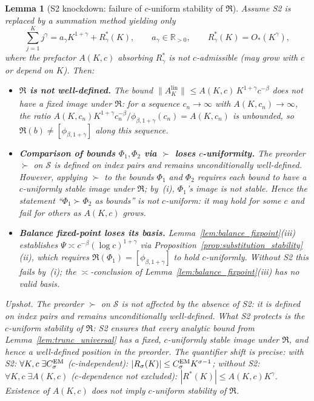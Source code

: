 \documentclass[12pt,a4paper]{amsart}
\newtheorem{lemma}[theorem]{Lemma}
\theoremstyle{definition}
\newcommand{\R}{\mathbb{R}}
\newcommand{\normh}[2]{\|#1\|_{#2}}
\newcommand{\AKlin}{A_K^{\mathrm{lin}}}
\begin{document}
\begin{lemma}[S2 knockdown: failure of $c$-uniform stability of $\mathfrak{R}$]
\label{lem:S2_knockdown}
Assume S2 is replaced by a summation method yielding only
\begin{equation}\label{eq:S2weak}
  \sum_{j=1}^K j^\gamma
  = a_\gamma K^{1+\gamma} + R_\gamma^*(K),
  \qquad a_\gamma\in\R_{>0},
  \qquad R_\gamma^*(K) = O_*(K^\gamma),
\end{equation}
where the prefactor $A(K,c)$ absorbing $R_\gamma^*$ is not
$c$-admissible (may grow with $c$ or depend on $K$).
Then:
\begin{itemize}[nosep]
  \item[\textup{(i)}] \textbf{$\mathfrak{R}$ is not well-defined.}
    The bound $\normh{\AKlin}{}\leq A(K,c)\,K^{1+\gamma}c^{-\beta}$
    does not have a fixed image under $\mathfrak{R}$:
    for a sequence $c_n\to\infty$ with $A(K,c_n)\to\infty$,
    the ratio $A(K,c_n)K^{1+\gamma}c_n^{-\beta}/\phi_{\beta,1+\gamma}(c_n)
    = A(K,c_n)$ is unbounded,
    so $\mathfrak{R}(b)\neq [\phi_{\beta,1+\gamma}]$ along this sequence.

  \item[\textup{(ii)}] \textbf{Comparison of bounds $\Phi_1,\Phi_2$
    via $\succ$ loses $c$-uniformity.}
    The preorder $\succ$ on $\mathcal{S}$ is defined on index pairs
    and remains unconditionally well-defined.
    However, applying $\succ$ to the \emph{bounds} $\Phi_1$ and $\Phi_2$
    requires each bound to have a $c$-uniformly stable image under
    $\mathfrak{R}$; by~(i), $\Phi_1$'s image is not stable.
    Hence the statement ``$\Phi_1\succ\Phi_2$ as bounds'' is not
    $c$-uniform: it may hold for some $c$ and fail for others
    as $A(K,c)$ grows.

  \item[\textup{(iii)}] \textbf{Balance fixed-point loses its basis.}
    Lemma~\ref{lem:balance_fixpoint}(iii) establishes
    $\Psi \asymp c^{-\beta}(\log c)^{1+\gamma}$
    via Proposition~\ref{prop:substitution_stability}(ii),
    which requires $\mathfrak{R}(\Phi_1)=[\phi_{\beta,1+\gamma}]$
    to hold $c$-uniformly.
    Without S2 this fails by~(i);
    the $\asymp$-conclusion of Lemma~\ref{lem:balance_fixpoint}(iii)
    has no valid basis.
\end{itemize}

\emph{Upshot.}
The preorder $\succ$ on $\mathcal{S}$ is not affected by the absence of S2:
it is defined on index pairs and remains unconditionally well-defined.
What S2 protects is the $c$-uniform stability of $\mathfrak{R}$:
S2 ensures that every analytic bound from
Lemma~\ref{lem:trunc_universal} has a fixed,
$c$-uniformly stable image under $\mathfrak{R}$,
and hence a well-defined position in the preorder.
The quantifier shift is precise:
with S2: $\forall K,c\;\exists C_\sigma^{\rm EM}$
($c$-independent): $|R_\sigma(K)|\leq C_\sigma^{\rm EM} K^{\sigma-1}$;
without S2: $\forall K,c\;\exists A(K,c)$
($c$-dependence not excluded): $|R^*(K)|\leq A(K,c) K^\gamma$.
Existence of $A(K,c)$ does not imply $c$-uniform stability of $\mathfrak{R}$.
\end{lemma}
\end{document}
